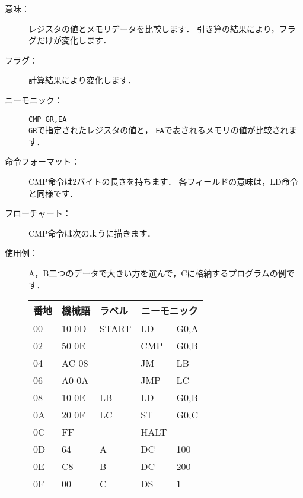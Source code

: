 \begin{description}
\item[意味：]レジスタの値とメモリデータを比較します．
  引き算の結果により，フラグだけが変化します．

\item[フラグ：]計算結果により変化します．

\item[ニーモニック：]\texttt{CMP  GR,EA} \\
  \texttt{GR}で指定されたレジスタの値と，
  \texttt{EA}で表されるメモリの値が比較されます．

\item[命令フォーマット：]CMP命令は2バイトの長さを持ちます．
  各フィールドの意味は，LD命令と同様です．


\item[フローチャート：]CMP命令は次のように描きます．

  \begin{center}
  \end{center}

\item[使用例：]
  A，B二つのデータで大きい方を選んで，Cに格納するプログラムの例です．

  {\ttfamily\begin{center}
    \begin{tabular}{|l|l|l|l l|} \hline
      番地 & 機械語 & ラベル & \multicolumn{2}{|c|}{ニーモニック} \\
      \hline
      00 & 10 0D & START & LD   & G0,A \\
      02 & 50 0E &       & CMP  & G0,B \\
      04 & AC 08 &       & JM   & LB   \\
      06 & A0 0A &       & JMP  & LC   \\
      08 & 10 0E & LB    & LD   & G0,B \\
      0A & 20 0F & LC    & ST   & G0,C \\
      0C & FF    &       & HALT & \\
      0D & 64    & A     & DC   & 100  \\
      0E & C8    & B     & DC   & 200  \\
      0F & 00    & C     & DS   & 1    \\
      \hline
    \end{tabular}
  \end{center}}
\end{description}

